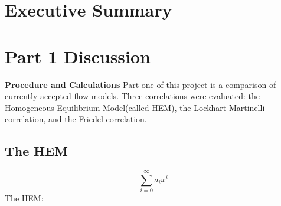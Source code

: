 \documentclass[10pt]{article}
\begin{document}
\section{Executive Summary}
\section{Part 1 Discussion}

\textbf{Procedure and Calculations}
Part one of this project is a comparison of currently accepted flow models.  Three correlations were evaluated: the Homogeneous Equilibrium Model(called HEM), the Lockhart-Martinelli correlation, and the Friedel correlation.
\subsection{The HEM} \label{subsection}
 
\begin{equation} \label{eq:1}
\sum_{i=0}^{\infty} a_i x^i
\end{equation}The HEM:
\end{document}

